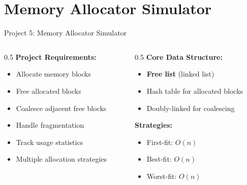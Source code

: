 \documentclass[aspectratio=169,xcolor=dvipsnames]{beamer}
\begin{document}
\section{Memory Allocator Simulator}

\begin{frame}{Project 5: Memory Allocator Simulator}
  \begin{columns}
    \begin{column}{0.5\textwidth}
      \textbf{Project Requirements:}
      \begin{itemize}
        \item Allocate memory blocks
        \item Free allocated blocks
        \item Coalesce adjacent free blocks
        \item Handle fragmentation
        \item Track usage statistics
        \item Multiple allocation strategies
      \end{itemize}
    \end{column}

    \begin{column}{0.5\textwidth}
      \textbf{Core Data Structure:}
      \begin{itemize}
        \item \textbf{Free list} (linked list)
        \item Hash table for allocated blocks
        \item Doubly-linked for coalescing
      \end{itemize}

      \vspace{0.3cm}
      \textbf{Strategies:}
      \begin{itemize}
        \item First-fit: $O(n)$
        \item Best-fit: $O(n)$
        \item Worst-fit: $O(n)$
      \end{itemize}
    \end{column}
  \end{columns}
\end{frame}
\end{document}
